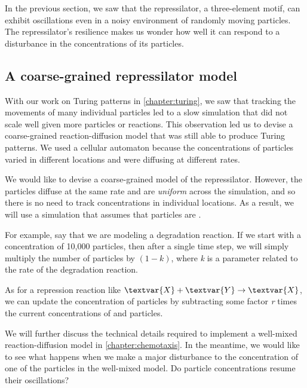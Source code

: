 In the previous section, we saw that the repressilator, a three-element motif, can exhibit oscillations even in a noisy environment of randomly moving particles. The repressilator's resilience makes us wonder how well it can respond to a disturbance in the concentrations of its particles.

\FloatBarrier
{}
\subsection{A coarse-grained repressilator model}

With our work on Turing patterns in \autoref{chapter:turing}, we saw that tracking the movements of many individual particles led to a slow simulation that did not scale well given more particles or reactions. This observation led us to devise a coarse-grained reaction-diffusion model that was still able to produce Turing patterns. We used a cellular automaton because the concentrations of particles varied in different locations and were diffusing at different rates.

We would like to devise a coarse-grained model of the repressilator. However, the particles diffuse at the same rate and are \textit{uniform} across the simulation, and so there is no need to track concentrations in individual locations. As a result, we will use a simulation that assumes that particles are .

For example, say that we are modeling a degradation reaction. If we start with a concentration of 10,000  particles, then after a single time step, we will simply multiply the number of  particles by $(1-k)$, where \textit{k} is a parameter related to the rate of the degradation reaction.

As for a repression reaction like $\textvar{X} + \textvar{Y} \rightarrow \textvar{X}$, we can update the concentration of  particles by subtracting some factor \textit{r} times the current concentrations of  and  particles.

We will further discuss the technical details required to implement a well-mixed reaction-diffusion model in \autoref{chapter:chemotaxis}. In the meantime, we would like to see what happens when we make a major disturbance to the concentration of one of the particles in the well-mixed model. Do particle concentrations resume their oscillations?

\FloatBarrier
{}
